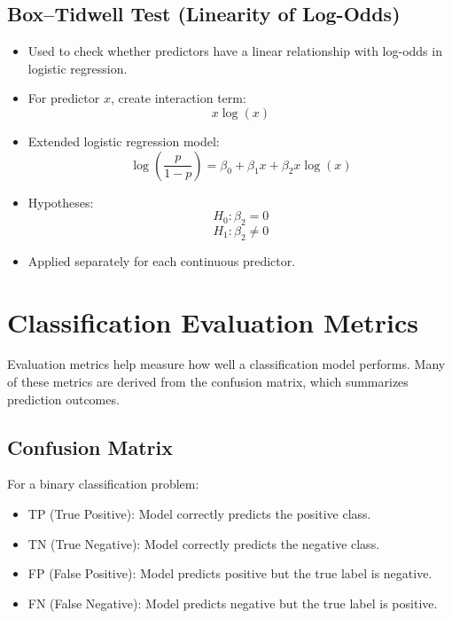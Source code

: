 \documentclass[10pt,a4paper]{article}
\begin{document}
	
	\subsection{Box--Tidwell Test (Linearity of Log-Odds)}
	
	\begin{itemize}
	    \item Used to check whether predictors have a linear relationship with log-odds in logistic regression.
	    
	    \item For predictor $x$, create interaction term:
	    $$
	    x \log(x)
	    $$
	    
	    \item Extended logistic regression model:
	    $$
	    \log\left(\frac{p}{1-p}\right)=\beta_0 + \beta_1 x + \beta_2 x\log(x)
	    $$
	    
	    \item Hypotheses:
	    $$
	    H_0 : \beta_2 = 0
	    $$
	    $$
	    H_1 : \beta_2 \neq 0
	    $$
	    
	    \item Applied separately for each continuous predictor.
	\end{itemize}
	
	
	\newpage 
	\section{Classification Evaluation Metrics}

	Evaluation metrics help measure how well a classification model performs.
	Many of these metrics are derived from the confusion matrix, which summarizes prediction outcomes.

	\subsection{Confusion Matrix}

	For a binary classification problem:

	\begin{itemize}
		\item TP (True Positive): Model correctly predicts the positive class.
		\item TN (True Negative): Model correctly predicts the negative class.
		\item FP (False Positive): Model predicts positive but the true label is negative.
		\item FN (False Negative): Model predicts negative but the true label is positive.
	\end{itemize}
\end{document}

